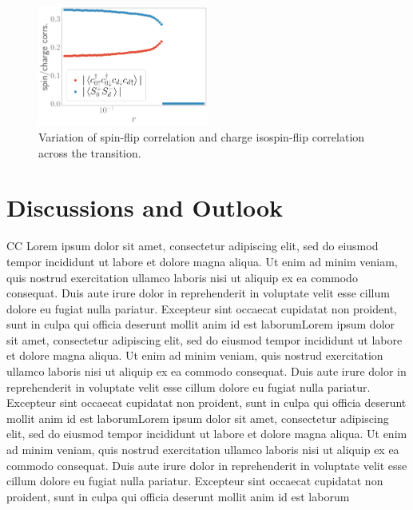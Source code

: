 \documentclass[reprint,superscriptaddress,floatfix]{revtex4-2}
\begin{document}
\begin{figure}[htpb]
	\centering
	\includegraphics[width=0.5\textwidth]{odlro_d0.pdf}
	\caption{Variation of spin-flip correlation and charge isospin-flip correlation across the transition.}
	\label{charge-spin}
\end{figure}

\section{Discussions and Outlook}
CC
Lorem ipsum dolor sit amet, consectetur adipiscing elit, sed do eiusmod tempor incididunt ut labore et dolore magna aliqua. Ut enim ad minim veniam, quis nostrud exercitation ullamco laboris nisi ut aliquip ex ea commodo consequat. Duis aute irure dolor in reprehenderit in voluptate velit esse cillum dolore eu fugiat nulla pariatur. Excepteur sint occaecat cupidatat non proident, sunt in culpa qui officia deserunt mollit anim id est laborumLorem ipsum dolor sit amet, consectetur adipiscing elit, sed do eiusmod tempor incididunt ut labore et dolore magna aliqua. Ut enim ad minim veniam, quis nostrud exercitation ullamco laboris nisi ut aliquip ex ea commodo consequat. Duis aute irure dolor in reprehenderit in voluptate velit esse cillum dolore eu fugiat nulla pariatur. Excepteur sint occaecat cupidatat non proident, sunt in culpa qui officia deserunt mollit anim id est laborumLorem ipsum dolor sit amet, consectetur adipiscing elit, sed do eiusmod tempor incididunt ut labore et dolore magna aliqua. Ut enim ad minim veniam, quis nostrud exercitation ullamco laboris nisi ut aliquip ex ea commodo consequat. Duis aute irure dolor in reprehenderit in voluptate velit esse cillum dolore eu fugiat nulla pariatur. Excepteur sint occaecat cupidatat non proident, sunt in culpa qui officia deserunt mollit anim id est laborum
\end{document}
